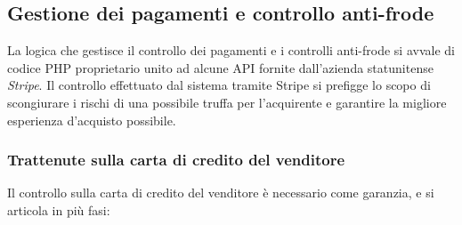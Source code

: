 \subsection{Gestione dei pagamenti e controllo anti-frode} \label{fraud}
La logica che gestisce il controllo dei pagamenti e i controlli anti-frode si avvale di codice PHP proprietario unito ad alcune API fornite dall'azienda statunitense \emph{Stripe}. 
Il controllo effettuato dal sistema tramite Stripe si prefigge lo scopo di scongiurare i rischi di una possibile truffa per l'acquirente e garantire la migliore esperienza d'acquisto possibile. 
\subsubsection{Trattenute sulla carta di credito del venditore} \label{tratt}
Il controllo sulla carta di credito del venditore è necessario come garanzia, e si articola in più fasi: 
